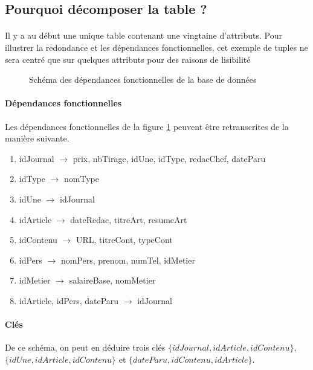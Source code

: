 \subsection{Pourquoi décomposer la table ?}
\paragraph{}{Il y a au début une unique table contenant une vingtaine d'attributs. Pour illustrer la redondance et les dépendances fonctionnelles, cet exemple de tuples ne sera centré que sur quelques attributs pour des raisons de lisibilité}


\begin{figure}
	\label{sch_df}
	\centering
	
	\caption{Schéma des dépendances fonctionnelles de la base de données}
\end{figure} 

\paragraph{Dépendances fonctionnelles}{Les dépendances fonctionnelles de la figure \ref{sch_df} peuvent être retranscrites de la manière suivante.
}
\begin{enumerate}
    \item[(1)] idJournal $\rightarrow$ prix, nbTirage, idUne, idType, redacChef, dateParu
    \item[(2)] idType $\rightarrow$ nomType
    \item[(3)] idUne $\rightarrow$ idJournal
    \item[(4)] idArticle $\rightarrow$ dateRedac, titreArt, resumeArt
    \item[(5)] idContenu $\rightarrow$ URL, titreCont, typeCont
    \item[(6)] idPers $\rightarrow$ nomPers, prenom, numTel, idMetier
    \item[(7)] idMetier $\rightarrow$ salaireBase, nomMetier
    \item[(8)] idArticle, idPers, dateParu $\rightarrow$ idJournal
\end{enumerate}

\paragraph{Clés}{
    De ce schéma, on peut en déduire trois clés $\{idJournal, idArticle, idContenu\}$, $\{idUne, idArticle, idContenu\}$ et $\{dateParu, idContenu, idArticle\}$.
}

